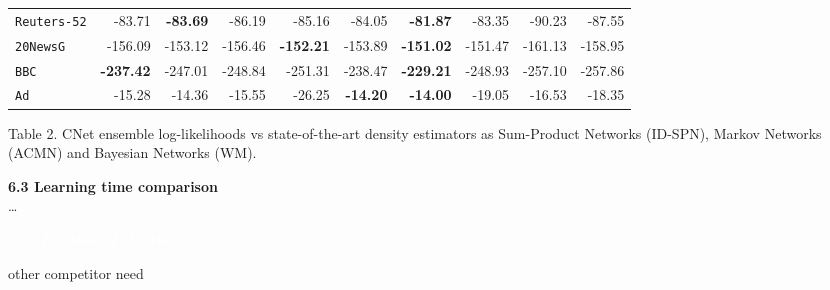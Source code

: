 \documentclass[final]{beamer}
\newcommand{\highlighttext}[2][yellow]{{\colorbox{#1}{\strut\textcolor{white}{#2}}}}
\begin{document}
\begin{frame}{}
\begin{textblock}{17.5}
\begin{table}[t]
\begin{tabular}{l r r r r  r | r r r r}
    \texttt{Reuters-52} & -83.71                               & \textbf{-83.69}                                & -86.19                 & -85.16  & -84.05  & \textbf{-81.87}  & -83.35         & -90.23          & -87.55          \\ 
    \texttt{20NewsG}    & -156.09                              & -153.12                               & -156.46                & \textbf{-152.21} & -153.89 & \textbf{-151.02} & -151.47        & -161.13         & -158.95         \\ 
    \texttt{BBC}        & \textbf{-237.42}                              & -247.01                               & -248.84                & -251.31 & -238.47 & \textbf{-229.21} & -248.93        & -257.10         & -257.86         \\ 
    \texttt{Ad}         & -15.28                               & -14.36                                & -15.55                 & -26.25  & \textbf{-14.20}  & \textbf{-14.00}  & -19.05         & -16.53          & -18.35          \\ 
    \bottomrule
  \end{tabular}
  \label{tab:ll-ens}
\end{table}
\hspace{50pt}\begin{minipage}{0.8\linewidth}
 \scriptsize Table 2. CNet ensemble  log-likelihoods vs state-of-the-art density estimators as
  Sum-Product Networks (\textsf{ID-SPN}), Markov Networks
  (\textsf{ACMN}) and Bayesian Networks (\textsf{WM}). 
\end{minipage}

\vspace{15pt}
{\bf 6.3 Learning time comparison} \\\hspace{20pt}\dots \highlighttext[gold4]{\emph{\textbf{in a fraction of the time}}}
other competitor need\\[10pt]
\hspace{-20pt}
\begin{minipage}{1.0\linewidth}
  

\end{minipage}
\end{textblock}
\end{frame}
\end{document}

